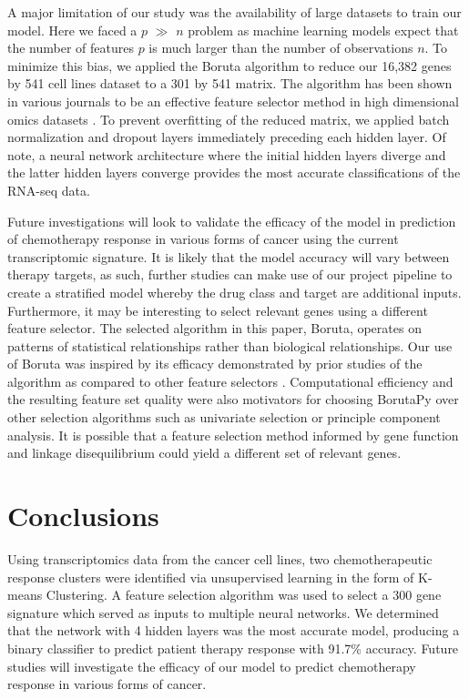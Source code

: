 \documentclass[10pt, letterpaper]{article}
\begin{document}
\begin{multicols}{2}
A major limitation of our study was the availability of large datasets to train our model. Here we faced a $p$ $\gg$ $n$ problem as machine learning models expect that the number of features $p$ is much larger than the number of observations $n$. To minimize this bias, we applied the Boruta algorithm to reduce our 16,382 genes by 541 cell lines dataset to a 301 by 541 matrix. The algorithm has been shown in various journals to be an effective feature selector method in high dimensional omics datasets \cite{boruta}. To prevent overfitting of the reduced matrix, we applied batch normalization and dropout layers immediately preceding each hidden layer. Of note, a neural network architecture where the initial hidden layers diverge and the latter hidden layers converge provides the most accurate classifications of the RNA-seq data.

Future investigations will look to validate the efficacy of the model in prediction of chemotherapy response in various forms of cancer using the current transcriptomic signature. It is likely that the model accuracy will vary between therapy targets, as such, further studies can make use of our project pipeline to create a stratified model whereby the drug class and target are additional inputs. Furthermore, it may be interesting to select relevant genes using a different feature selector. The selected algorithm in this paper, Boruta, operates on patterns of statistical relationships rather than biological relationships. Our use of Boruta was inspired by its efficacy demonstrated by prior studies of the algorithm as compared to other feature selectors \cite{boruta, deep_cell}. Computational efficiency and the resulting feature set quality were also motivators for choosing BorutaPy over other selection algorithms such as univariate selection or principle component analysis. It is possible that a feature selection method informed by gene function and linkage disequilibrium could yield a different set of relevant genes.


\section{Conclusions}
Using transcriptomics data from the cancer cell lines, two chemotherapeutic response clusters were identified via unsupervised learning in the form of K-means Clustering. A feature selection algorithm was used to select a 300 gene signature which served as inputs to multiple neural networks. We determined that the network with 4 hidden layers was the most accurate model, producing a binary classifier to predict patient therapy response with 91.7\% accuracy. Future studies will investigate the efficacy of our model to predict chemotherapy response in various forms of cancer.



\end{multicols}
\end{document}
